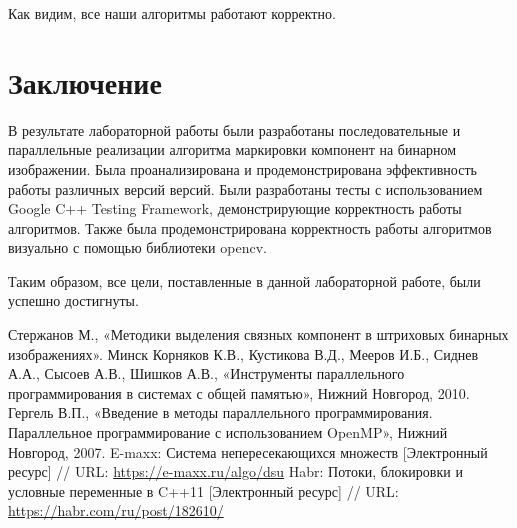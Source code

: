 \documentclass{report}
\begin{document}
\par Как видим, все наши алгоритмы работают корректно.

\newpage
\section*{Заключение}
	\par В результате лабораторной работы были разработаны последовательные и параллельные реализации алгоритма маркировки компонент на бинарном изображении. Была проанализирована и продемонстрирована эффективность работы различных версий версий. Были разработаны тесты с использованием Google C++ Testing Framework, демонстрирующие корректность работы алгоритмов. Также была продемонстрирована корректность работы алгоритмов визуально с помощью библиотеки opencv.
\par Таким образом, все цели, поставленные в данной лабораторной работе, были успешно достигнуты.

\newpage
\begin{thebibliography}{1}
 Стержанов М., «Методики выделения связных компонент в штриховых бинарных изображениях». Минск
 Корняков К.В., Кустикова В.Д., Мееров И.Б., Сиднев А.А., Сысоев А.В., Шишков А.В., «Инструменты параллельного программирования в системах с общей памятью», Нижний Новгород, 2010.
 Гергель В.П., «Введение в методы параллельного
программирования. Параллельное программирование с использованием
OpenMP», Нижний Новгород, 2007.
 E-maxx: Система непересекающихся множеств [Электронный ресурс] // URL: \url{https://e-maxx.ru/algo/dsu}
 Habr: Потоки, блокировки и условные переменные в C++11 [Электронный ресурс] // URL: \url{https://habr.com/ru/post/182610/}
\end{thebibliography}
\newpage
\end{document}
